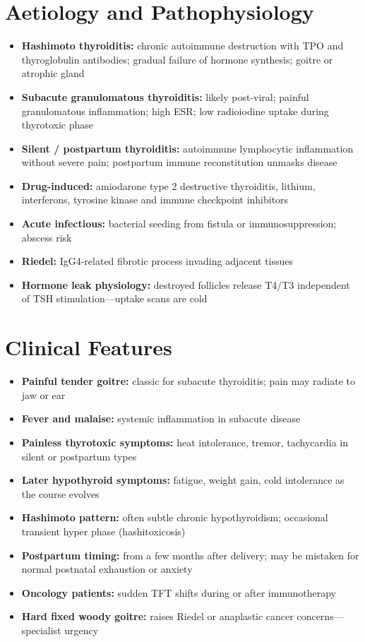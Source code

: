 \section*{Aetiology and Pathophysiology}
\begin{itemize}
    \item \textbf{Hashimoto thyroiditis:} chronic autoimmune destruction with TPO and thyroglobulin antibodies; gradual failure of hormone synthesis; goitre or atrophic gland
    \item \textbf{Subacute granulomatous thyroiditis:} likely post-viral; painful granulomatous inflammation; high ESR; low radioiodine uptake during thyrotoxic phase
    \item \textbf{Silent / postpartum thyroiditis:} autoimmune lymphocytic inflammation without severe pain; postpartum immune reconstitution unmasks disease
    \item \textbf{Drug-induced:} amiodarone type 2 destructive thyroiditis, lithium, interferons, tyrosine kinase and immune checkpoint inhibitors
    \item \textbf{Acute infectious:} bacterial seeding from fistula or immunosuppression; abscess risk
    \item \textbf{Riedel:} IgG4-related fibrotic process invading adjacent tissues
    \item \textbf{Hormone leak physiology:} destroyed follicles release T4/T3 independent of TSH stimulation---uptake scans are cold
\end{itemize}

\section*{Clinical Features}
\begin{itemize}
    \item \textbf{Painful tender goitre:} classic for subacute thyroiditis; pain may radiate to jaw or ear
    \item \textbf{Fever and malaise:} systemic inflammation in subacute disease
    \item \textbf{Painless thyrotoxic symptoms:} heat intolerance, tremor, tachycardia in silent or postpartum types
    \item \textbf{Later hypothyroid symptoms:} fatigue, weight gain, cold intolerance as the course evolves
    \item \textbf{Hashimoto pattern:} often subtle chronic hypothyroidism; occasional transient hyper phase (hashitoxicosis)
    \item \textbf{Postpartum timing:} from a few months after delivery; may be mistaken for normal postnatal exhaustion or anxiety
    \item \textbf{Oncology patients:} sudden TFT shifts during or after immunotherapy
    \item \textbf{Hard fixed woody goitre:} raises Riedel or anaplastic cancer concerns---specialist urgency
\end{itemize}


